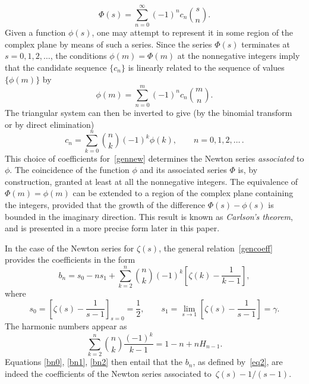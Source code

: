 \documentclass{amsart}
\begin{document}
\begin{equation}\label{gennew}
\Phi(s)=\sum_{n=0}^\infty (-1)^n c_n \binom{s}{n}.
\end{equation}
Given a function $\phi(s)$, one may attempt to represent it 
in some region of the complex plane by means of 
such a series. Since the series $\Phi(s)$ terminates at $s=0,1,2,\ldots$,
the conditions $\phi(m)=\Phi(m)$ at the nonnegative integers
imply that the candidate sequence $\{c_n\}$ is linearly related to the
sequence of values $\{\phi(m)\}$ by
\[
\phi(m)=\sum_{n=0}^m (-1)^n c_n \binom{m}{n}.
\]
The triangular system can then be inverted to 
give (by the binomial transform~\cite{GrKnPa89} or by direct elimination)
\begin{equation}\label{gencoeff}
c_n = \sum_{k=0}^{n} \binom{n}{k} (-1)^k \phi(k), \qquad n=0,1,2,\ldots\,.
\end{equation}
This choice of coefficients for~\eqref{gennew}
determines the Newton series \emph{associated} to $\phi$.
The coincidence of 
the function $\phi$ and its associated series
$\Phi$ is, by construction, granted at least
at all the nonnegative integers. The equivalence
of $\Phi(m)=\phi(m)$ can be extended to a region
of the complex plane containing the integers, provided that the
growth of the difference $\Phi(s)-\phi(s)$ is bounded in the imaginary
direction. This result is known as \emph{Carlson's theorem}, and is
presented in a more precise form later in this paper.

In the case of the Newton series for $\zeta(s)$, the general
relation~\eqref{gencoeff} provides the coefficients in the form
\begin{equation}\label{bn0}
b_n = s_0-ns_1+\sum_{k=2}^n \binom{n}{k} (-1)^k \left[\zeta(k)-\frac{1}{k-1}
\right],
\end{equation}
where
\begin{equation}\label{bn1}
s_0=\left[\zeta(s)-\frac{1}{s-1}\right]_{s=0}=\frac12,
\qquad
s_1=\lim_{s\to 1} \left[\zeta(s)-\frac{1}{s-1}\right] = \gamma.
\end{equation}
The harmonic numbers appear as
\begin{equation}\label{bn2}
\sum_{k=2}^n \binom{n}{k}\frac{(-1)^k}{k-1}=1-n+nH_{n-1}.
\end{equation}
Equations \eqref{bn0}, \eqref{bn1},   \eqref{bn2} 
then entail that   the
$b_n$, as  defined by~\eqref{eq2}, are indeed the  coefficients  of the Newton series
associated to~$\zeta(s)-1/(s-1)$.

\smallskip
\end{document}
